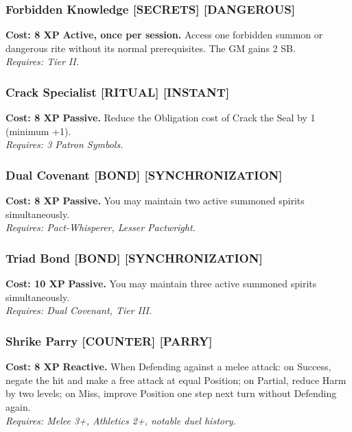 \subsubsection*{Forbidden Knowledge \textnormal{[SECRETS] [DANGEROUS]}}
\label{talent:forbidden-knowledge}
\textbf{Cost: 8 XP} \textbf{Active, once per session.} Access one forbidden summon or dangerous rite without its normal prerequisites. The GM gains 2 SB. \\
\textit{Requires: Tier II.}

\subsubsection*{Crack Specialist \textnormal{[RITUAL] [INSTANT]}}
\label{talent:crack-specialist}
\textbf{Cost: 8 XP} \textbf{Passive.} Reduce the Obligation cost of Crack the Seal by 1 (minimum +1). \\
\textit{Requires: 3 Patron Symbols.}

\subsubsection*{Dual Covenant \textnormal{[BOND] [SYNCHRONIZATION]}}
\label{talent:dual-covenant}
\textbf{Cost: 8 XP} \textbf{Passive.} You may maintain two active summoned spirits simultaneously. \\
\textit{Requires: Pact-Whisperer, Lesser Pactwright.}

\subsubsection*{Triad Bond \textnormal{[BOND] [SYNCHRONIZATION]}}
\label{talent:triad-bond}
\textbf{Cost: 10 XP} \textbf{Passive.} You may maintain three active summoned spirits simultaneously. \\
\textit{Requires: Dual Covenant, Tier III.}

\subsubsection*{Shrike Parry \textnormal{[COUNTER] [PARRY]}}
\label{talent:shrike-parry}
\textbf{Cost: 8 XP} \textbf{Reactive.} When Defending against a melee attack: on Success, negate the hit and make a free attack at equal Position; on Partial, reduce Harm by two levels; on Miss, improve Position one step next turn without Defending again. \\
\textit{Requires: Melee 3+, Athletics 2+, notable duel history.}


